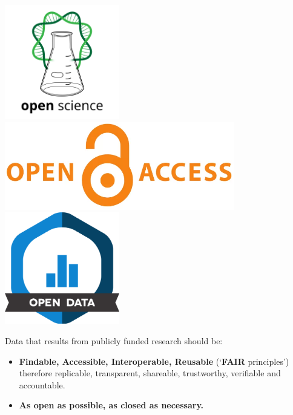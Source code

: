 \documentclass[a0,portrait]{a0poster}
\begin{document}
\begin{multicols}{3}
\includegraphics[width=5cm]{Poster TEX/style/Open Science.png} 
\hspace{\fill} 
\includegraphics[width=10cm]{Poster TEX/style/Open access (4).png}
\hspace{\fill} 
\includegraphics[width=5cm]{Poster TEX/style/Open data.png}

Data that results from publicly funded research should be:

\begin{itemize}
\item \textbf{Findable, Accessible, Interoperable, Reusable} (‘\textbf{FAIR} principles’) \cite{2022_EUA} \cite{EU_2018-790}
 therefore replicable, transparent, shareable, trustworthy, verifiable and accountable.
\item \textbf{As open as possible, as closed as necessary.}
\end{itemize}
\color{black}



\end{multicols}
\end{document}
